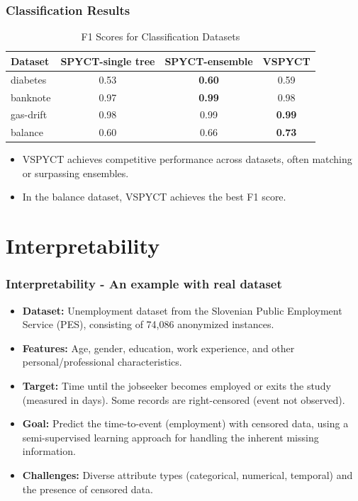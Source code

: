 \documentclass{beamer}
\begin{document}
\begin{frame}
  \frametitle{Classification Results}
  
  \begin{table}[h!]
    \centering
    \caption{F1 Scores for Classification Datasets}
    \label{tab:classification_results}
    \scriptsize
    \begin{tabular}{lccc}
    \toprule
    \textbf{Dataset} & \textbf{SPYCT-single tree} & \textbf{SPYCT-ensemble} & \textbf{VSPYCT} \\
    \midrule
    diabetes              & 0.53                            & \textbf{0.60}            & 0.59 \\
    banknote              & 0.97                            & \textbf{0.99}            & 0.98 \\
    gas-drift             & 0.98                            & 0.99            & \textbf{0.99} \\
    balance               & 0.60                            & 0.66                     & \textbf{0.73} \\
    \bottomrule
    \end{tabular}
  \end{table}
  
  \vspace{0.2cm}
  \begin{itemize}
    \item VSPYCT achieves competitive performance across datasets, often matching or surpassing ensembles.
    \item In the balance dataset, VSPYCT achieves the best F1 score.
  \end{itemize}
  
\end{frame}

\section{Interpretability}
\begin{frame}
  \frametitle{Interpretability - An example with real dataset}

  \begin{itemize}
    \item \textbf{Dataset:} Unemployment dataset from the Slovenian Public Employment Service (PES), consisting of 74,086 anonymized instances.
    \item \textbf{Features:} Age, gender, education, work experience, and other personal/professional characteristics.
    \item \textbf{Target:} Time until the jobseeker becomes employed or exits the study (measured in days). Some records are right-censored (event not observed).
    \item \textbf{Goal:} Predict the time-to-event (employment) with censored data, using a semi-supervised learning approach for handling the inherent missing information.
    \item \textbf{Challenges:} Diverse attribute types (categorical, numerical, temporal) and the presence of censored data.
  \end{itemize}

\end{frame}
\end{document}
